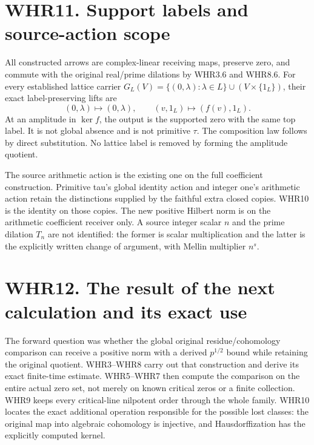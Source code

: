 \section{WHR11. Support labels and source-action
scope}\label{whr11.-support-labels-and-source-action-scope}

All constructed arrows are complex-linear receiving maps, preserve zero,
and commute with the original real/prime dilations by WHR3.6 and WHR8.6.
For every established lattice carrier
\(G_L(V)=\{(0,\lambda):\lambda\in L\}\cup(V\times\{1_L\})\), their exact
label-preserving lifts are \[
 (0,\lambda)\longmapsto(0,\lambda),\qquad
 (v,1_L)\longmapsto(f(v),1_L).
 \tag{WHR11.1}
\] At an amplitude in \(\ker f\), the output is the supported zero with
the same top label. It is not global absence and is not primitive
\(\tau\). The composition law follows by direct substitution. No lattice
label is removed by forming the amplitude quotient.

The source arithmetic action is the existing one on the full coefficient
construction. Primitive tau's global identity action and integer one's
arithmetic action retain the distinctions supplied by the faithful extra
closed copies. WHR10 is the identity on those copies. The new positive
Hilbert norm is on the arithmetic coefficient receiver only. A source
integer scalar \(n\) and the prime dilation \(T_n\) are not identified:
the former is scalar multiplication and the latter is the explicitly
written change of argument, with Mellin multiplier \(n^s\).

\section{WHR12. The result of the next calculation and its exact
use}\label{whr12.-the-result-of-the-next-calculation-and-its-exact-use}

The forward question was whether the global original residue/cohomology
comparison can receive a positive norm with a derived \(p^{1/2}\) bound
while retaining the original quotient. WHR3--WHR8 carry out that
construction and derive its exact finite-time estimate. WHR5--WHR7 then
compute the comparison on the entire actual zero set, not merely on
known critical zeros or a finite collection. WHR9 keeps every
critical-line nilpotent order through the whole family. WHR10 locates
the exact additional operation responsible for the possible lost
classes: the original map into algebraic cohomology is injective, and
Hausdorffization has the explicitly computed kernel.

